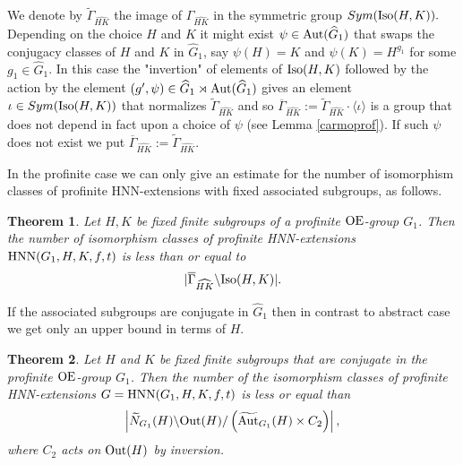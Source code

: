 \documentclass[a4paper,12pt]{article}
\newtheorem{thm}{Theorem}[section]
\def\OE{{\rm OE}}
\def\aut {{\rm Aut}}
\def\out {{\rm Out}}
\def\hnn {{\rm HNN}}
\def\Iso {{\rm Iso}}
\begin{document}
  We denote by $\widetilde\Gamma_{\widehat{HK}}$ the image of $\Gamma_{\widehat{HK}}$ in the symmetric group $Sym(\Iso(H,K)).$ Depending on the choice   $H$ and $K$  it might exist $\psi\in \aut(\widehat G_1)$  that swaps the conjugacy classes of $H$ and $K$ in $\widehat G_1$, say $\psi(H)=K$ and  $\psi(K)=H^{g_1}$ for some $g_1\in \widehat G_1$. In this case the "invertion" of elements of $\Iso(H,K)$ followed by the action by the element $( g', \psi)\in \widehat G_1\rtimes \aut(\widehat G_1)$ %
  gives an element $\iota\in Sym(\Iso(H,K))$ that normalizes $\widetilde\Gamma_{\widehat{HK}}$ 
  and so $\overline\Gamma_{\widehat{HK}}:=\widetilde\Gamma_{\widehat{HK}} \cdot \langle\iota\rangle$ is a group that does not depend in fact upon a choice of $\psi$ (see Lemma \ref{carmoprof}). If such $\psi$ does not exist we put $\overline\Gamma_{\widehat{HK}}:=\widetilde\Gamma_{\widehat{HK}}$.
  

In the profinite case we can only give an estimate for the number of isomorphism classes of profinite HNN-extensions with fixed associated subgroups, as follows.
\begin{thm}  Let $H, K$ be fixed finite subgroups of a profinite $\OE$-group $G_1$. Then the number of isomorphism classes of profinite HNN-extensions \\$\hnn(G_1, H, K, f, t)$ is less than or equal to $$|\overline{\Gamma}_{\widehat{HK}} \backslash \Iso(H, K)|.$$\end{thm}  



If the associated subgroups are conjugate in $\widehat G_1$  then in contrast to abstract case we get only an upper bound in terms of $H$.

\begin{thm} Let $H$ and $K$ be fixed finite subgroups that are conjugate in the profinite $\OE$-group $G_1$. Then the number of the isomorphism classes of profinite HNN-extensions $G=\hnn(G_1, H, K, f, t)$ is less or equal than $$\left| \widetilde N_{G_1}(H) \backslash \out(H)/ \left( \widetilde{\aut}_{G_1}(H) \times C_2\right) \right|,$$ where $C_2$ acts on $\out(H)$ by inversion. 
\end{thm}
\end{document}
